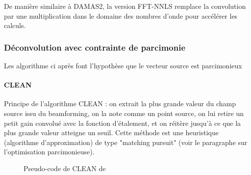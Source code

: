 De manière similaire à DAMAS2, la version FFT-NNLS remplace la convolution par une multiplication dans le domaine des nombres d'onde pour accélérer les calculs.

\subsubsection{Déconvolution avec contrainte de parcimonie}
Les algorithme ci après font l'hypothèse que le vecteur source est parcimonieux

\paragraph{CLEAN}
Principe de l'algorithme CLEAN \citep{Hogbom1974} : on extrait la plus grande valeur du champ source issu du beamforming, on la note comme un point source, on lui retire un petit gain convolué avec la fonction d'étalement, et on réitère jusqu'à ce que la plus grande valeur atteigne un seuil. Cette méthode est une heuristique (algorithme d'approximation) de type "matching pursuit" (voir le paragraphe sur l'optimisation parcimonieuse).\\

\begin{figure}[!h]
	\centering
	\caption{Pseudo-code de CLEAN de \cite{Hogbom1974}}
\end{figure}


